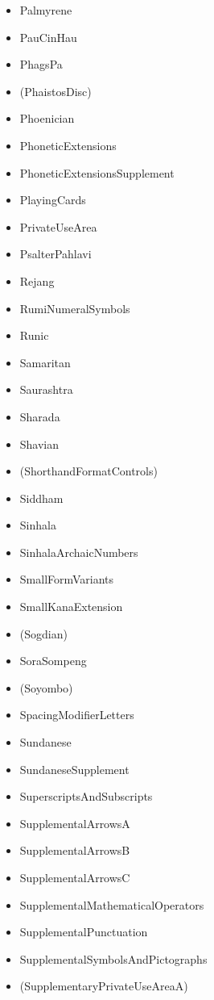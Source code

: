 \documentclass{article}
\newenvironment{itemlist}{%
  \begin{itemize}
  \setlength{\itemsep}{0pt}
  \setlength{\parsep}{0pt}
  \setlength{\topsep}{0pt}
  \setlength{\partopsep}{0pt}
  \setlength{\parskip}{0pt}
  \setlength{\labelsep}{5pt}}%
{
  \end{itemize}}
\begin{document}
\begin{multicols*}{2}
\begin{itemlist}
        \item Palmyrene
        \item PauCinHau
        \item PhagsPa
        \item (PhaistosDisc)
        \item Phoenician
        \item PhoneticExtensions
        \item PhoneticExtensionsSupplement
        \item PlayingCards
        \item PrivateUseArea
        \item PsalterPahlavi
        \item Rejang
        \item RumiNumeralSymbols
        \item Runic
        \item Samaritan
        \item Saurashtra
        \item Sharada
        \item Shavian
        \item (ShorthandFormatControls)
        \item Siddham
        \item Sinhala
        \item SinhalaArchaicNumbers
        \item SmallFormVariants
        \item SmallKanaExtension
        \item (Sogdian)
        \item SoraSompeng
        \item (Soyombo)
        \item SpacingModifierLetters
        \item Sundanese
        \item SundaneseSupplement
        \item SuperscriptsAndSubscripts
        \item SupplementalArrowsA
        \item SupplementalArrowsB
        \item SupplementalArrowsC
        \item SupplementalMathematicalOperators
        \item SupplementalPunctuation
        \item SupplementalSymbolsAndPictographs
        \item (SupplementaryPrivateUseAreaA)

\end{itemlist}
\end{multicols*}
\end{document}
